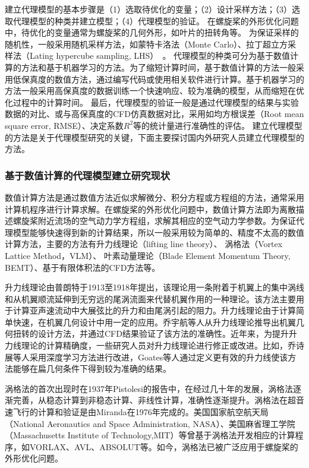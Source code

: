 建立代理模型的基本步骤是（1）选取待优化的变量；（2）设计采样方法；（3）选取代理模型的种类并建立模型；（4）代理模型的验证。
在螺旋桨的外形优化问题中，待优化的变量通常为螺旋桨的几何外形，如叶片的扭转角\cite{Qiao2013, WangTY2023}等。
为保证采样的随机性，一般采用随机采样方法，如蒙特卡洛法（Monte Carlo）、拉丁超立方采样法（Lating hypercube sampling, LHS）~\cite{Iuliano2018,Liu2023}。
代理模型的种类可分为基于数值计算的方法和基于机器学习的方法。为了缩短计算时间，基于数值计算的方法一般采用低保真度的数值方法，通过编写代码或使用相关软件进行计算。基于机器学习的方法一般采用高保真度的数据训练一个快速响应、较为准确的模型，从而缩短在优化过程中的计算时间。
最后，代理模型的验证一般是通过代理模型的结果与实验数据的对比、或与高保真度的CFD仿真数据对比，采用如均方根误差（Root mean square error, RMSE）、决定系数$R^2$等的统计量进行准确性的评估。
建立代理模型的方法是关于代理模型研究的关键，下面主要探讨国内外研究人员建立代理模型的方法。

\vspace{0.8em}
\subsubsection{基于数值计算的代理模型建立研究现状}\label{Sec: numeric model}
\vspace{0.8em}

数值计算方法是通过数值方法近似求解微分、积分方程或方程组的方法，通常采用计算机程序进行计算求解。在螺旋桨的外形优化问题中，数值计算方法即为离散描述螺旋桨附近流场的空气动力学方程组，求解其相应的空气动力学参数。为保证代理模型能够快速得到新的计算结果，所以一般采用较为简单的、精度不太高的数值计算方法，主要的方法有升力线理论（lifting line theory）、
涡格法（Vortex Lattice Method，VLM）、
叶素动量理论（Blade Element Momentum Theory, BEMT）、基于有限体积法的CFD方法等。

升力线理论由普朗特于1913至1918年提出，该理论用一条附着于机翼上的集中涡线和从机翼顺流延伸到无穷远的尾涡流面来代替机翼作用的一种理论。该方法主要用于计算亚声速流动中大展弦比的升力和由尾涡引起的阻力。升力线理论由于计算简单快速，在机翼几何设计中用一定的应用。乔宇航等人从升力线理论推导出机翼几何扭转的设计方法，并通过CFD结果验证了该方法的准确性\cite{Qiao2013}。近年来，为提升升力线理论的计算精确度，一些研究人员对升力线理论进行修正或改进。比如，乔诗展等人采用深度学习方法进行改进\cite{Qiao2022}，Goates等人通过定义更有效的升力线使该方法能够在扁几何条件下得到较为准确的结果\cite{Goates2022}。

涡格法的首次出现时在1937年Pistolesi的报告中\cite{Pistolesi1937}，在经过几十年的发展，涡格法逐渐完善，从稳态计算到非稳态计算、非线性计算，准确性逐渐提升。涡格法在超音速飞行的计算和验证是由Miranda在1976年完成的\cite{Miranda1976}。美国国家航空航天局（National Aeronautics and Space Administration, NASA）、美国麻省理工学院（Massachusetts Institute of Technology,MIT）等曾基于涡格法开发相应的计算程序，如VORLAX\cite{Miranda1976}、AVL\cite{Budziak2015}、ABSOLUT\cite{Bueso2011}等。如今，涡格法已被广泛应用于螺旋桨的外形优化问题\cite{Cho1998,Kier2005,Guimares2021}。

